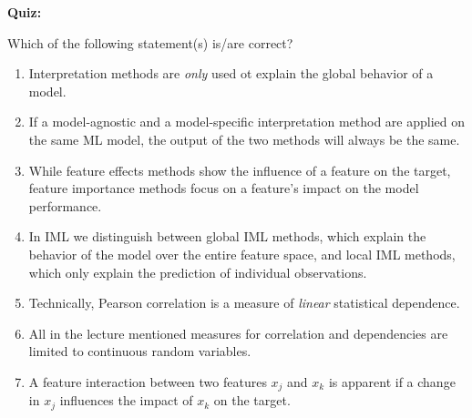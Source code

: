 \textbf{Quiz:}\\ \noindent
\vspace{0.1cm}

Which of the following statement(s) is/are correct?  
        	\begin{enumerate}
        	\item Interpretation methods are \textit{only} used ot explain the global behavior of a model. 
        	\item If a model-agnostic and a model-specific interpretation method are applied on the same ML model, the output of the two methods will always be the same.
        	\item While feature effects methods show the influence of a feature on the target, feature importance methods focus on a feature's impact on the model performance.
        	\item In IML we distinguish between global IML methods, which explain the behavior of the model over the entire feature space, and local IML methods, which only explain the prediction of individual observations. 
        	\item Technically, Pearson correlation is a measure of \textit{linear} statistical dependence. 
        	\item All in the lecture mentioned measures for correlation and dependencies are limited to continuous random variables.
        	\item A feature interaction between two features $x_j$ and $x_k$ is apparent if a change in $x_j$ influences the impact of $x_k$ on the target.
        \end{enumerate}
